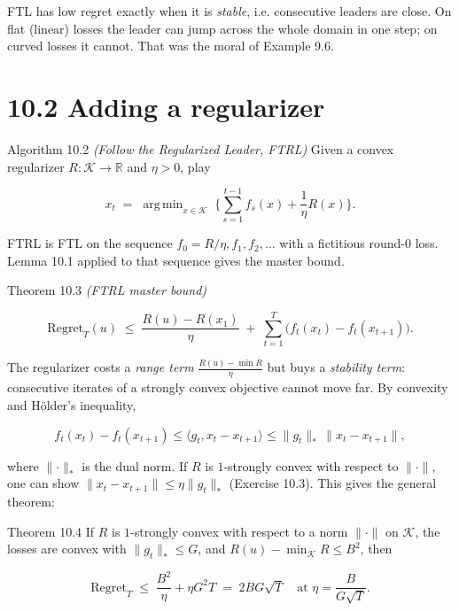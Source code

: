 \documentclass[11pt,a4paper,openany]{book}
\newcommand{\R}{\mathbb{R}}
\newcommand{\Reg}{\mathrm{Regret}}
\DeclareMathOperator*{\argmin}{arg\,min}
\newcommand{\ip}[2]{\langle #1,#2\rangle}
\newcommand{\norm}[1]{\lVert #1\rVert}
\newcommand{\cK}{\mathcal{K}}
\begin{document}
FTL has low regret exactly when it is \emph{stable}, i.e. consecutive leaders are close. On flat (linear) losses the leader can jump across the whole domain in one step; on curved losses it cannot. That was the moral of Example 9.6.

\section*{10.2 Adding a regularizer}\label{ch10-ftrl}

\begin{balg}{Algorithm 10.2 \emph{(Follow the Regularized Leader, FTRL)}}
Given a convex regularizer $R:\cK\to\R$ and $\eta>0$, play

\[x_t\;=\;\argmin_{x\in\cK}\;\Big\{\sum_{s=1}^{t-1}f_s(x)+\frac1\eta R(x)\Big\}.\]

\end{balg}

FTRL is FTL on the sequence $f_0=R/\eta,f_1,f_2,\dots$ with a fictitious round-$0$ loss. Lemma 10.1 applied to that sequence gives the master bound.

\begin{bthm}{Theorem 10.3 \emph{(FTRL master bound)}}

\[\Reg_T(u)\;\le\;\frac{R(u)-R(x_1)}{\eta}\;+\;\sum_{t=1}^T\big(f_t(x_t)-f_t(x_{t+1})\big).\]

\end{bthm}

The regularizer costs a \emph{range term} $\frac{R(u)-\min R}{\eta}$ but buys a \emph{stability term}: consecutive iterates of a strongly convex objective cannot move far. By convexity and Hölder's inequality,

\[f_t(x_t)-f_t(x_{t+1})\le\ip{g_t}{x_t-x_{t+1}}\le\norm{g_t}_*\,\norm{x_t-x_{t+1}},\]

where $\norm\cdot_*$ is the dual norm. If $R$ is $1$-strongly convex with respect to $\norm\cdot$, one can show $\norm{x_t-x_{t+1}}\le\eta\norm{g_t}_*$ (Exercise 10.3). This gives the general theorem:

\begin{bthm}{Theorem 10.4}
If $R$ is $1$-strongly convex with respect to a norm $\norm\cdot$ on $\cK$, the losses are convex with $\norm{g_t}_*\le G$, and $R(u)-\min_\cK R\le B^2$, then

\[\Reg_T\;\le\;\frac{B^2}{\eta}+\eta G^2T\;=\;2BG\sqrt T\quad\text{at }\eta=\frac{B}{G\sqrt T}.\]

\end{bthm}
\end{document}
